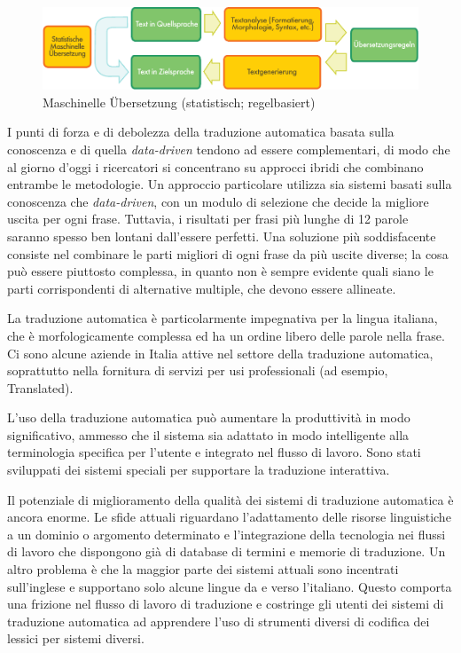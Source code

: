 \documentclass[]{../../metanetpaper}
\begin{document}
\begin{multicols}{2}
\begin{figure}[htb]
  \center
  \includegraphics[width=\textwidth]{../_media/german/machine_translation}
  \caption{Maschinelle Übersetzung (statistisch; regelbasiert)}
  \label{fig:mtarch_de}
\end{figure}

I punti di forza e di debolezza della traduzione automatica basata sulla conoscenza e di quella \emph{data-driven} tendono ad essere complementari, di modo che al giorno d'oggi i ricercatori si concentrano su approcci ibridi che combinano entrambe le metodologie. Un approccio particolare utilizza sia sistemi basati sulla conoscenza che \emph{data-driven}, con un modulo di selezione che decide la migliore uscita per ogni frase. Tuttavia, i risultati per frasi pi\`{u} lunghe di 12 parole saranno spesso ben lontani dall'essere perfetti. Una soluzione pi\`{u} soddisfacente consiste nel combinare le parti migliori di ogni frase da pi\`{u} uscite diverse; la cosa pu\`{o} essere piuttosto complessa, in quanto non \`{e} sempre evidente quali siano le parti corrispondenti di alternative multiple, che devono essere allineate.




La traduzione automatica \`{e} particolarmente impegnativa per la lingua italiana, che \`{e} morfologicamente complessa ed ha un ordine libero delle parole nella frase. Ci sono alcune aziende in Italia attive nel settore della traduzione automatica, soprattutto nella fornitura di servizi per usi professionali (ad esempio, Translated).

L'uso della traduzione automatica pu\`{o} aumentare la produttivit\`{a} in modo significativo, ammesso che il sistema sia adattato in modo intelligente alla terminologia specifica per l'utente e integrato nel flusso di lavoro. Sono stati sviluppati dei sistemi speciali per supportare la traduzione interattiva.

Il potenziale di miglioramento della qualit\`{a} dei sistemi di traduzione automatica \`{e} ancora enorme. Le sfide attuali riguardano l'adattamento delle risorse linguistiche a un dominio o argomento determinato e l'integrazione della tecnologia nei flussi di lavoro che dispongono gi\`{a} di database di termini e memorie di traduzione. Un altro problema \`{e} che la maggior parte dei sistemi attuali sono incentrati sull'inglese e supportano solo alcune lingue da e verso l'italiano. Questo comporta una frizione nel flusso di lavoro di traduzione e costringe gli utenti dei sistemi di traduzione automatica ad apprendere l'uso di strumenti diversi di codifica dei lessici per sistemi diversi.


\end{multicols}
\end{document}
